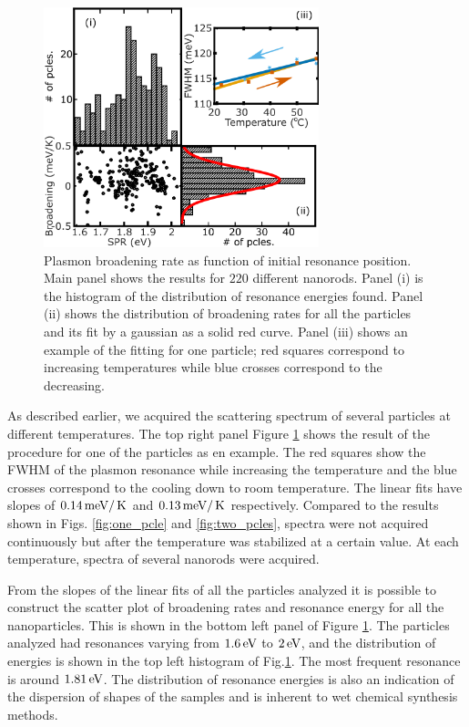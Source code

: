 \begin{figure}[tp] \centering
\includegraphics[width=8cm]{Chapters/05_WhiteLight/Figures/04_Many_Pcles/04_Many_Particles.png}
\caption{Plasmon broadening rate as function of initial resonance position. Main
panel shows the results for $220$ different nanorods. Panel (i) is the histogram
of the distribution of resonance energies found. Panel (ii) shows the
distribution of broadening rates for all the particles and its fit by a gaussian
as a solid red curve. Panel (iii) shows an example of the fitting for one
particle; red squares correspond to increasing temperatures while blue crosses
correspond to the decreasing.}
		\label{fig:many-pcles}
\end{figure}

As described earlier, we acquired the scattering spectrum of several particles
at different temperatures. The top right panel Figure \ref{fig:many-pcles} shows
the result of the procedure for one of the particles as en example. The red
squares show the FWHM of the plasmon resonance while increasing the
temperature and the blue crosses correspond to the cooling down to room
temperature. The linear fits have slopes of $0.14\,\textrm{meV}/\,\textrm{K}$ and $0.13\,\textrm{meV}/\,\textrm{K}$
respectively. Compared to the results shown in Figs. \ref{fig:one_pcle} and
\ref{fig:two_pcles}, spectra were not acquired continuously but after the
temperature was stabilized at a certain value. At each temperature, spectra
of several nanorods were acquired.

From the slopes of the linear fits of all the particles analyzed it is possible
to construct the scatter plot of broadening rates and resonance energy for all
the nanoparticles. This is shown in the bottom left panel of Figure
\ref{fig:many-pcles}. The particles analyzed had resonances varying from
$1.6\,\textrm{eV}$ to $2\,\textrm{eV}$, and the distribution of energies is shown in the top left
histogram of Fig.\ref{fig:many-pcles}. The most frequent resonance is around
$1.81\,\textrm{eV}$. The distribution of resonance energies is also an indication of the
dispersion of shapes of the samples and is inherent to wet chemical synthesis
methods.

